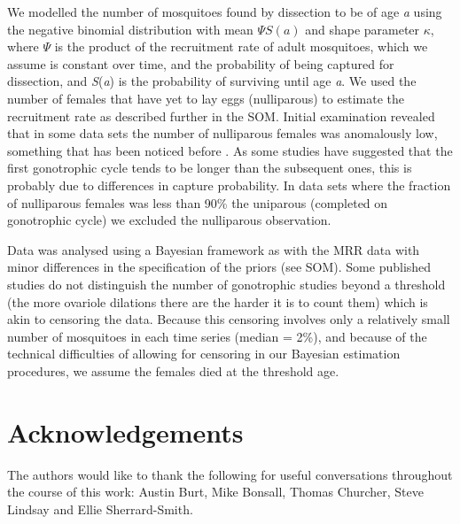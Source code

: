 \documentclass[]{article}
\begin{document}
We modelled the number of mosquitoes found by dissection to be of age
\emph{a} using the negative binomial distribution with mean
$\Psi S(a)$ and shape parameter $\kappa$, where
$\Psi$ is the product of the recruitment rate of adult mosquitoes,
which we assume is constant over time, and the probability of being
captured for dissection, and \emph{S}(\emph{a}) is the probability of
surviving until age \emph{a}. We used the number of females that have
yet to lay eggs (nulliparous) to estimate the recruitment rate as
described further in the SOM. Initial examination revealed that in some
data sets the number of nulliparous females was anomalously low,
something that has been noticed before \citep{gillies1965study}. As some
studies have suggested that the first gonotrophic cycle tends to be
longer than the subsequent ones, this is probably due to differences in
capture probability. In data sets where the fraction of nulliparous
females was less than 90\% the uniparous (completed on gonotrophic
cycle) we excluded the nulliparous observation.

Data was analysed using a Bayesian framework as with the MRR data with
minor differences in the specification of the priors (see SOM). Some
published studies do not distinguish the number of gonotrophic studies
beyond a threshold (the more ovariole dilations there are the harder it
is to count them) which is akin to censoring the data. Because this
censoring involves only a relatively small number of mosquitoes in each
time series (median = 2\%), and because of the technical difficulties of
allowing for censoring in our Bayesian estimation procedures, we assume
the females died at the threshold age.

\section{Acknowledgements}\label{acknowledgements}

The authors would like to thank the following for useful conversations
throughout the course of this work: Austin Burt, Mike Bonsall, Thomas Churcher, Steve
Lindsay and Ellie Sherrard-Smith.

\printbibliography
\end{document}
